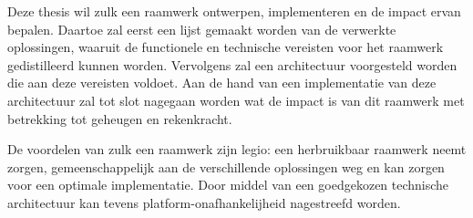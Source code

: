 Deze thesis wil zulk een raamwerk ontwerpen, implementeren en de impact ervan
bepalen. Daartoe zal eerst een lijst gemaakt worden van de verwerkte
oplossingen, waaruit de functionele en technische vereisten voor het raamwerk
gedistilleerd kunnen worden. Vervolgens zal een architectuur voorgesteld worden
die aan deze vereisten voldoet. Aan de hand van een implementatie van deze
architectuur zal tot slot nagegaan worden wat de impact is van dit raamwerk met
betrekking tot geheugen en rekenkracht.

De voordelen van zulk een raamwerk zijn legio: een herbruikbaar raamwerk neemt
zorgen, gemeenschappelijk aan de verschillende oplossingen weg en kan zorgen
voor een optimale implementatie. Door middel van een goedgekozen technische
architectuur kan tevens platform-onafhankelijheid nagestreefd worden.
